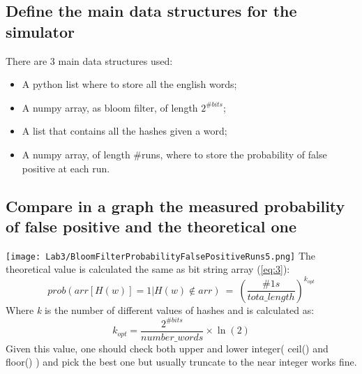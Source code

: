 \documentclass{report}
\begin{document}
{			\subsection{Define the main data structures for the simulator}
						There are 3 main data structures used: 
							\begin{itemize}
								\item A python list where to store all the english words;
								\item A numpy array, as bloom filter, of length $2^{\#bits}$;
								\item A list that contains all the hashes given a word;
								\item A numpy array, of length \#runs, where to store the probability of false positive at each run.
							\end{itemize}
					
			\subsection{Compare in a graph the measured probability of false positive and the theoretical one}
			\texttt{[image: Lab3/BloomFilterProbabilityFalsePositiveRuns5.png]}
			The theoretical value is calculated the same as bit string array (\ref{eq:3}):
			\begin{equation}\label{eq:5}
				prob(arr[H(w)]=1|H(w) \not\in arr) \: = \: \left( \frac{\#1s}{tota\_length} \right)^{k_{opt}}
			\end{equation}
			Where \emph{k} is the number of different values of hashes and is calculated as: 
			\[
					k_{opt} = \frac {2^{\#bits}}{number\_words} \times \ln(2)
			\]
			Given this value, one should check both upper and lower integer( ceil() and floor() ) and pick the best one but usually truncate to the near integer works fine.
			
			
			\newpage 
			
}
\end{document}
